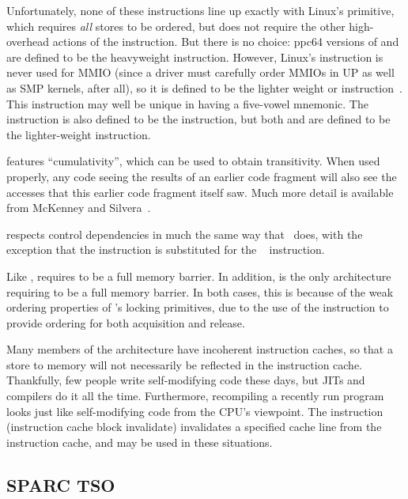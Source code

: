 Unfortunately, none of these instructions line up exactly with Linux's
 primitive, which requires {\em all} stores to be ordered,
but does not require the other high-overhead actions of the 
instruction.
But there is no choice: ppc64 versions of  and  are
defined to be the heavyweight  instruction.
However, Linux's  instruction is never used for MMIO
(since a driver must carefully order MMIOs in UP as well as
SMP kernels, after all), so it is defined to be the lighter weight
 or  instruction~\cite{PaulEMcKenney2016LinuxKernelMMIO}.
This instruction may well be unique in having a five-vowel mnemonic.
The  instruction is also defined to be the 
instruction, but both  and  are defined to
be the lighter-weight  instruction.

\Power{} features ``cumulativity'', which can be used to obtain
transitivity.
When used properly, any code seeing the results of an earlier
code fragment will also see the accesses that this earlier code
fragment itself saw.
Much more detail is available from
McKenney and Silvera~\cite{PaulEMcKenneyN2745r2009}.

\Power{} respects control dependencies in much the same way that \ARM\
does, with the exception that the \Power{}  instruction
is substituted for the \ARM\ \co{ISB} instruction.

Like , \Power{} requires  to be
a full memory barrier.
In addition, \Power{} is the only architecture requiring
 to be a full memory barrier.
In both cases, this is because of the weak ordering properties
of \Power{}'s locking primitives, due to the use of the 
instruction to provide ordering for both acquisition and release.

Many members of the \Power{} architecture have incoherent instruction
caches, so that a store to memory will not necessarily be reflected
in the instruction cache.
Thankfully, few people write self-modifying code these days, but JITs
and compilers do it all the time.
Furthermore, recompiling a recently run program looks just like
self-modifying code from the CPU's viewpoint.
The  instruction (instruction cache block invalidate)
invalidates a specified cache line from
the instruction cache, and may be used in these situations.

\subsection{SPARC TSO}

